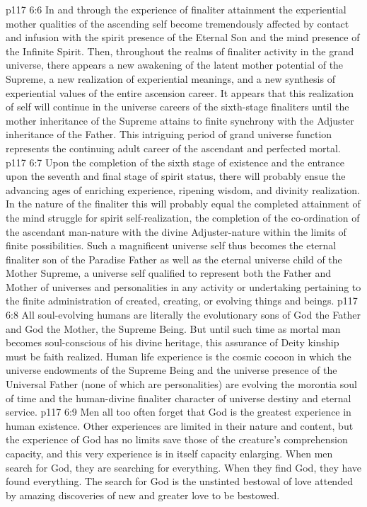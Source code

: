 \vs p117 6:6 In and through the experience of finaliter attainment the experiential mother qualities of the ascending self become tremendously affected by contact and infusion with the spirit presence of the Eternal Son and the mind presence of the Infinite Spirit. Then, throughout the realms of finaliter activity in the grand universe, there appears a new awakening of the latent mother potential of the Supreme, a new realization of experiential meanings, and a new synthesis of experiential values of the entire ascension career. It appears that this realization of self will continue in the universe careers of the sixth\hyp{}stage finaliters until the mother inheritance of the Supreme attains to finite synchrony with the Adjuster inheritance of the Father. This intriguing period of grand universe function represents the continuing adult career of the ascendant and perfected mortal.
\vs p117 6:7 Upon the completion of the sixth stage of existence and the entrance upon the seventh and final stage of spirit status, there will probably ensue the advancing ages of enriching experience, ripening wisdom, and divinity realization. In the nature of the finaliter this will probably equal the completed attainment of the mind struggle for spirit self\hyp{}realization, the completion of the co\hyp{}ordination of the ascendant man\hyp{}nature with the divine Adjuster\hyp{}nature within the limits of finite possibilities. Such a magnificent universe self thus becomes the eternal finaliter son of the Paradise Father as well as the eternal universe child of the Mother Supreme, a universe self qualified to represent both the Father and Mother of universes and personalities in any activity or undertaking pertaining to the finite administration of created, creating, or evolving things and beings.
\vs p117 6:8 All soul\hyp{}evolving humans are literally the evolutionary sons of God the Father and God the Mother, the Supreme Being. But until such time as mortal man becomes soul\hyp{}conscious of his divine heritage, this assurance of Deity kinship must be faith realized. Human life experience is the cosmic cocoon in which the universe endowments of the Supreme Being and the universe presence of the Universal Father (none of which are personalities) are evolving the morontia soul of time and the human\hyp{}divine finaliter character of universe destiny and eternal service.
\vs p117 6:9 \pc Men all too often forget that God is the greatest experience in human existence. Other experiences are limited in their nature and content, but the experience of God has no limits save those of the creature’s comprehension capacity, and this very experience is in itself capacity enlarging. When men search for God, they are searching for everything. When they find God, they have found everything. The search for God is the unstinted bestowal of love attended by amazing discoveries of new and greater love to be bestowed.
